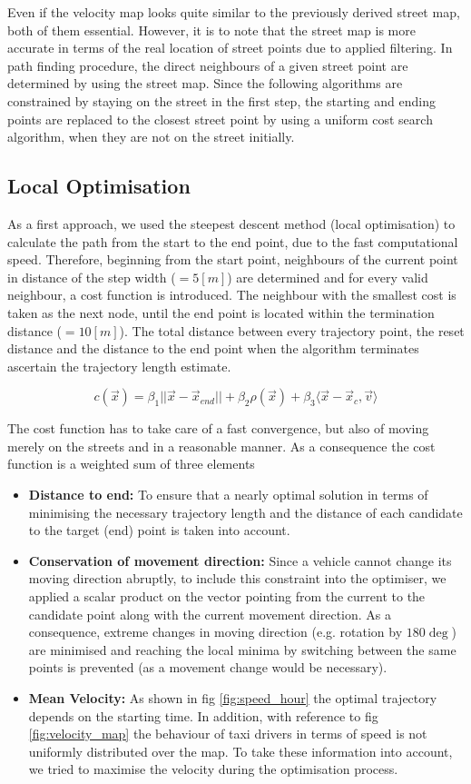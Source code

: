 \documentclass{article}
\begin{document}
\begin{multicols}{2}
Even if the velocity map looks quite similar to the previously derived street map, both of them essential. However, it is to note that the street map is more accurate in terms of the real location of street points due to applied filtering. In path finding procedure, the direct neighbours of a given street point are determined by using the street map. Since the following algorithms are constrained by staying on the street in the first step, the starting and ending points are replaced to the closest street point by using a uniform cost search algorithm, when they are not on the street initially.     

\subsection{Local Optimisation}
As a first approach, we used the steepest descent method (local optimisation) to calculate the path from the start to the end point, due to the fast computational speed. Therefore, beginning from the start point, neighbours of the current point in distance of the step width ($=5 [m]$) are determined and for every valid neighbour, a cost function is introduced. The neighbour with the smallest cost is taken as the next node, until the end point is located within the termination distance ($=10[m]$). The total distance between every trajectory point, the reset distance and the distance to the end point when the algorithm terminates ascertain the trajectory length estimate. 

$$c(\vec{x}) = \beta_1 ||\vec{x} - \vec{x}_{end}|| + \beta_2 \rho(\vec{x}) + \beta_3 \langle \vec{x} - \vec{x}_c, \vec{v} \rangle$$

The cost function has to take care of a fast convergence, but also of moving merely on the streets and in a reasonable manner. As a consequence the cost function is a weighted sum of three elements

\begin{itemize}
\item \textbf{Distance to end: } To ensure that a nearly optimal solution in terms of minimising the necessary trajectory length and the distance of each candidate to the target (end) point is taken into account. 
\item \textbf{Conservation of movement direction: } Since a vehicle cannot change its moving direction abruptly, to include this constraint into the optimiser, we applied a scalar product on the vector pointing from the current to the candidate point along with the current movement direction. As a consequence, extreme changes in moving direction (e.g. rotation by $180 \deg$) are minimised and reaching the local minima by switching between the same points is prevented (as a movement change would be necessary). 
\item \textbf{Mean Velocity: } As shown in fig \ref{fig:speed_hour} the optimal trajectory depends on the starting time. In addition, with reference to fig \ref{fig:velocity_map} the behaviour of taxi drivers in terms of speed is not uniformly distributed over the map. To take these information into account, we tried to maximise the velocity during the optimisation process. 
\end{itemize}


\end{multicols}
\end{document}
